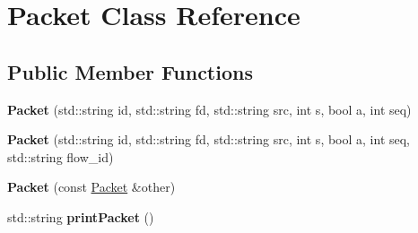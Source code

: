 \hypertarget{classPacket}{\section{\-Packet \-Class \-Reference}
\label{classPacket}
}
\subsection*{\-Public \-Member \-Functions}
\begin{DoxyCompactItemize}
\item 
\hypertarget{classPacket_adad25df1f7cd92863fe024b611654ca0}{{\bfseries \-Packet} (std\-::string id, std\-::string fd, std\-::string src, int s, bool a, int seq)}\label{classPacket_adad25df1f7cd92863fe024b611654ca0}

\item 
\hypertarget{classPacket_a42b25c5d0ca62985777047ae06c0f299}{{\bfseries \-Packet} (std\-::string id, std\-::string fd, std\-::string src, int s, bool a, int seq, std\-::string flow\-\_\-id)}\label{classPacket_a42b25c5d0ca62985777047ae06c0f299}

\item 
\hypertarget{classPacket_ae8d5dfea51fa7fe55e4705b176f326ec}{{\bfseries \-Packet} (const \hyperlink{classPacket}{\-Packet} \&other)}\label{classPacket_ae8d5dfea51fa7fe55e4705b176f326ec}

\item 
\hypertarget{classPacket_af2fa4ac151c764a022093e7fa826a6c2}{std\-::string {\bfseries print\-Packet} ()}\label{classPacket_af2fa4ac151c764a022093e7fa826a6c2}

\end{DoxyCompactItemize}
